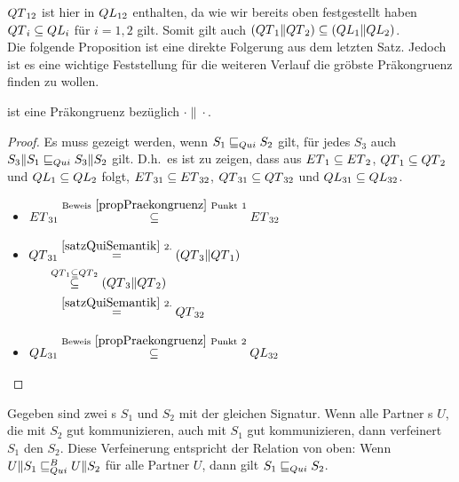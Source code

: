 $QT{}_{12}$ ist hier in $QL{}_{12}$ enthalten, da wie wir bereits oben festgestellt
haben $QT{}_i\subseteq QL{}_i$ für $i=1,2$ gilt. Somit gilt auch
$(QT{}_1\|QT{}_2)\subseteq (QL{}_1\|QL{}_2)$.\\
Die folgende Proposition ist eine direkte Folgerung aus dem letzten Satz.
Jedoch ist es eine wichtige Feststellung für die weiteren Verlauf die gröbste
Präkongruenz finden zu wollen.

\begin{prop}[Präkongruenz]
  \label{propQuiPrae}
  \QRel{} ist eine Präkongruenz bezüglich $\cdot\|\cdot$.
\end{prop}

\begin{proof}
  Es muss gezeigt werden, wenn $S_1\sqsubseteq _{Qui} S_2$ gilt,  für   jedes $
  S_3$ auch $S_3\|S_1\sqsubseteq _{Qui} S_3\|S_2$ gilt. D.h.\ es ist zu zeigen,
  dass aus $ET{}_1\subseteq ET{}_2$, $QT{}_1\subseteq QT{}_2$ und $QL{}_1\subseteq QL{}_2$
  folgt, $ET{}_{31}\subseteq ET{}_{32}$, $QT{}_{31}\subseteq QT{}_{32}$ und
  $QL{}_{31}\subseteq QL{}_{32}$.
  \begin{itemize}
    \item $\begin{aligned}[t]
        ET{}_{31} \overset{\mathrm{Beweis}~\ref{propPraekongruenz}
        ~\mathrm{Punkt}~1}{\subseteq} ET{}_{32}
    \end{aligned}$
    \item $\begin{aligned}[t]
        \QT{}_{31} &\overset{\ref{satzQuiSemantik}~2.}{=} (\QT{}_3\|\QT{}_1)\\
                &\hspace{-0.3cm}\overset{\QT{}_1\subseteq \QT{}_2}{\subseteq} (\QT{}_3\|\QT{}_2)\\
                &\overset{\ref{satzQuiSemantik}~2.}{=} \QT{}_{32}
    \end{aligned}$
    \item $\begin{aligned}[t]
        QL{}_{31} \overset{\mathrm{Beweis}~\ref{propPraekongruenz}
        ~\mathrm{Punkt}~2}{\subseteq} QL{}_{32}
    \end{aligned}$
  \end{itemize}
\end{proof}

\begin{lem}
  \label{lemQuiVerfeinerung}
  Gegeben sind zwei \EIO{}s $S_1$ und $S_2$ mit der gleichen Signatur. Wenn
  alle Partner \EIO{}s $U$, die mit $S_2$  gut kommunizieren, auch mit $S_1$
  gut kommunizieren, dann verfeinert $S_1$ den \EIO{} $S_2$. Diese Verfeinerung
  entspricht der Relation \QRel{} von oben: Wenn $U\|S_1\sqsubseteq _{Qui}^B U\|S_2$ für alle
  Partner $U$, dann gilt $S_1\sqsubseteq _{Qui} S_2$.
\end{lem}

